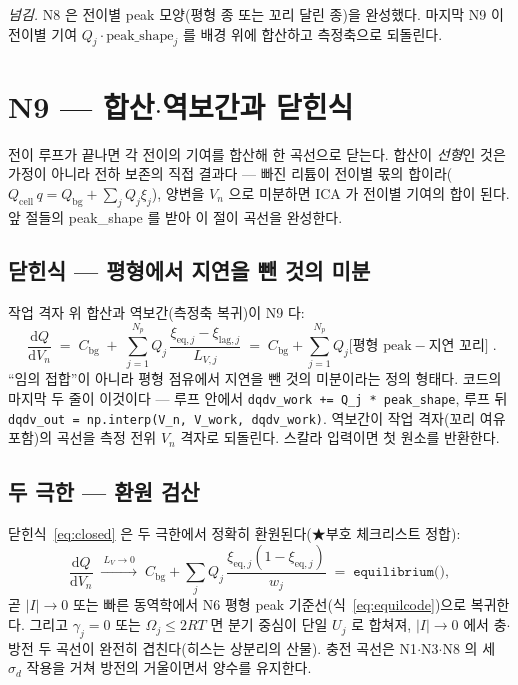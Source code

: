 \documentclass[11pt,a4paper]{article}
\newcommand{\dd}{\mathrm{d}}
\newcommand{\eq}{\mathrm{eq}}
\newcommand{\cell}{\mathrm{cell}}
\newcommand{\bg}{\mathrm{bg}}
\newcommand{\lag}{\mathrm{lag}}
\newcommand{\code}[1]{\texttt{#1}}
\begin{document}
\medskip
\emph{넘김.} N8 은 전이별 peak 모양(평형 종 또는 꼬리 달린 종)을 완성했다. 마지막 N9 이 전이별 기여 $Q_j\cdot\text{peak\_shape}_j$ 를 배경 위에 합산하고 측정축으로 되돌린다.

\section{N9 — 합산$\cdot$역보간과 닫힌식}\label{sec:summation}
전이 루프가 끝나면 각 전이의 기여를 합산해 한 곡선으로 닫는다. 합산이 \emph{선형}인 것은 가정이 아니라 전하 보존의 직접 결과다 — 빠진 리튬이 전이별 몫의 합이라($Q_\cell\,q=Q_\bg+\sum_j Q_j\xi_j$), 양변을 $V_n$ 으로 미분하면 ICA 가 전이별 기여의 합이 된다. 앞 절들의 peak\_shape 를 받아 이 절이 곡선을 완성한다.

\subsection{닫힌식 — 평형에서 지연을 뺀 것의 미분}
작업 격자 위 합산과 역보간(측정축 복귀)이 N9 다:
\begin{equation}
\boxed{\;\frac{\dd Q}{\dd V_n}\;=\;C_\bg\;+\;\sum_{j=1}^{N_p}Q_j\,\frac{\xi_{\eq,j}-\xi_{\lag,j}}{L_{V,j}}
\;=\;C_\bg+\sum_{j=1}^{N_p}Q_j\big[\text{평형 peak}-\text{지연 꼬리}\big]\;.}
\label{eq:closed}
\end{equation}
``임의 접합''이 아니라 평형 점유에서 지연을 뺀 것의 미분이라는 정의 형태다. 코드의 마지막 두 줄이 이것이다 — 루프 안에서 \code{dqdv\_work += Q\_j * peak\_shape}, 루프 뒤 \code{dqdv\_out = np.interp(V\_n, V\_work, dqdv\_work)}. 역보간이 작업 격자(꼬리 여유 포함)의 곡선을 측정 전위 $V_n$ 격자로 되돌린다. 스칼라 입력이면 첫 원소를 반환한다.

\subsection{두 극한 — 환원 검산}
닫힌식~\eqref{eq:closed} 은 두 극한에서 정확히 환원된다(★부호 체크리스트 정합):
\begin{equation}
\frac{\dd Q}{\dd V_n}\;\xrightarrow{\ L_V\to0\ }\;
C_\bg+\sum_j Q_j\,\frac{\xi_{\eq,j}(1-\xi_{\eq,j})}{w_j}
\;=\;\code{equilibrium()},
\label{eq:reduce}
\end{equation}
곧 $|I|\to0$ 또는 빠른 동역학에서 N6 평형 peak 기준선(식~\eqref{eq:equilcode})으로 복귀한다. 그리고 $\gamma_j=0$ 또는 $\Omega_j\le2RT$ 면 분기 중심이 단일 $U_j$ 로 합쳐져, $|I|\to0$ 에서 충$\cdot$방전 두 곡선이 완전히 겹친다(히스는 상분리의 산물). 충전 곡선은 N1$\cdot$N3$\cdot$N8 의 세 $\sigma_d$ 작용을 거쳐 방전의 거울이면서 양수를 유지한다.
\end{document}
